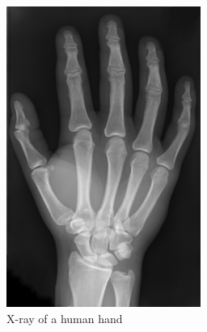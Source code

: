 \documentclass[a4paper,11pt]{kth-mag}
\begin{document}
\begin{figure}[!ht]
    \centering
    \begin{subfigure}[t]{0.35\textwidth}
        \includegraphics[width=\textwidth]{images/handskeletone.png}
        \caption{X-ray of a human hand}
        \label{fig:hand}
    \end{subfigure}
    \begin{subfigure}[t]{0.55\textwidth}

\end{subfigure}
\end{figure}
\end{document}

